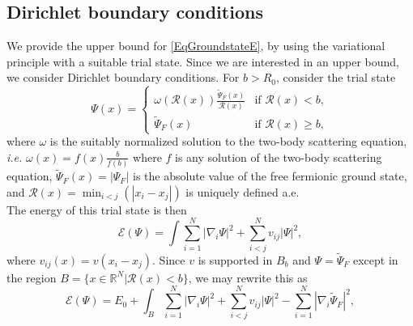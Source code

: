\documentclass[a4paper,11pt]{article}
\newcommand{\abs}[1]{\left\lvert #1 \right\rvert}
\newcommand{\ie}{\emph{i.e.} }
\newcommand{\R}{\mathbb{R}}
\newcommand{\rr}{\mathcal{R}}
\numberwithin{equation}{section}
\begin{document}
	\subsection{Dirichlet boundary conditions}
	We provide the upper bound for \eqref{EqGroundstateE}, by using the variational principle with a suitable trial state. Since we are interested in an upper bound, we consider Dirichlet boundary conditions.
	 For $ b>R_0 $, consider the trial state	\begin{equation}
	 \Psi(x)=\begin{cases}
	 \omega(\rr(x))\frac{\tilde{\Psi}_F(x)}{\rr(x)}& \text{if }\rr(x)<b,\\
	 \tilde{\Psi}_F(x)&\text{if }\rr(x)\geq b,
	 \end{cases}
	 \end{equation}
	 where $ \omega $ is the suitably normalized solution to the two-body scattering equation, \ie $ \omega(x)=f(x)\frac{b}{f(b)} $ where $ f $ is any solution of the two-body scattering equation,  $ \tilde{\Psi}_F(x)=\abs{\Psi_F} $ is the absolute value of the free fermionic ground state, and $ \rr(x)=\min_{i<j}(\abs{x_i-x_j}) $ is uniquely defined a.e.\\
	The energy of this trial state is then\begin{equation}
	\mathcal{E}(\Psi)=\int \sum_{i=1}^{N}\abs{\nabla_i\Psi}^2+\sum_{i<j}^{N}v_{ij}\abs{\Psi}^2,
	\end{equation}
	where $ v_{ij}(x)=v(x_i-x_j) $. Since $ v $ is supported in $ B_b $ and $ \Psi=\tilde{\Psi}_F $ except in the region $ B=\{x\in\R^N \vert \rr(x)<b \} $, we may rewrite this as \begin{equation}
	\mathcal{E}(\Psi)=E_0+\int_B \sum_{i=1}^{N}\abs{\nabla_i\Psi}^2+\sum_{i<j}^{N}v_{ij}\abs{\Psi}^2-\sum_{i=1}^{N}\abs{\nabla_i\tilde{\Psi}_F}^2,
	\end{equation}
\end{document}
